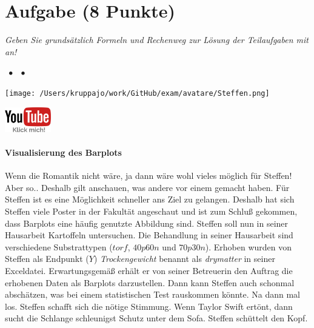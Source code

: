 \documentclass[a4paper, 9pt]{scrartcl}\usepackage[]{graphicx}\usepackage[]{xcolor}
\begin{document}
\section{Aufgabe \hfill (8 Punkte)}

\textit{Geben Sie grundsätzlich Formeln und Rechenweg zur Lösung der Teilaufgaben mit an!} \\[1Ex]
 

 
\ifcollection
\begin{flushright}
\tiny\vspace{-3Ex}
\textbf{\examinhaltstart}
\exammodulemathstat $\;\bullet$
\exammodulestat $\;\bullet$
\exammodulestatbbv 
\vspace{-4Ex}
\end{flushright}
\begin{minipage}[t]{0.5\textwidth}
\texttt{[image: /Users/kruppajo/work/GitHub/exam/avatare/Steffen.png]}
\end{minipage}
\begin{minipage}[t]{0.5\textwidth}
\hfill
\href{https://youtu.be/vXnLttRL_VI}{\includegraphics[width = 2cm]{img/youtube}}
\end{minipage}
\vspace{-3ex}
\fi



\ifcollection
\paragraph{Visualisierung des Barplots}
\fi

Wenn die Romantik nicht wäre, ja dann wäre wohl vieles möglich für Steffen! Aber so.. Deshalb gilt anschauen, was andere vor einem gemacht haben. Für Steffen ist es eine Möglichkeit schneller ans Ziel zu gelangen. Deshalb hat sich Steffen viele Poster in der Fakultät angeschaut und ist zum Schluß gekommen, dass Barplots eine häufig genutzte Abbildung sind. Steffen soll nun in seiner Hausarbeit Kartoffeln untersuchen. Die Behandlung in seiner Hausarbeit sind verschiedene Substrattypen ($torf$, $40p60n$ und $70p30n$). Erhoben wurden von Steffen als Endpunkt ($Y$) \textit{Trockengewicht} benannt als \textit{drymatter} in seiner Exceldatei. Erwartungsgemäß erhält er von seiner Betreuerin den Auftrag die erhobenen Daten als Barplots darzustellen. Dann kann Steffen auch schonmal abschätzen, was bei einem statistischen Test rauskommen könnte. Na dann mal los. Steffen schafft sich die nötige Stimmung. Wenn Taylor Swift ertönt, dann sucht die Schlange schleunigst Schutz unter dem Sofa. Steffen schüttelt den Kopf.
\end{document}
